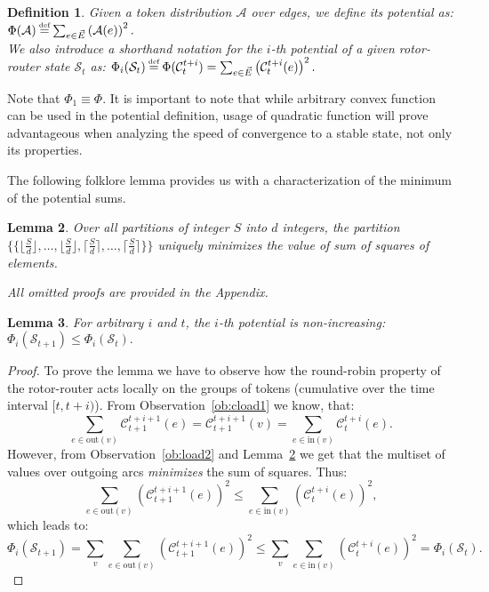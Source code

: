 \documentclass{article}[11pt,letter]
\newtheorem{definition}{Definition}[section]
\newtheorem{lemma}[definition]{Lemma}
\newcommand{\state}{\mathcal{S}}
\newcommand{\inedg}{\mathrm{in}}
\newcommand{\outedg}{\mathrm{out}}
\newcommand{\cload}{\mathcal{C}}
\newcommand{\mset}[1]{\{\!\{#1\}\!\}}
\newcommand\defeq{\stackrel{\mathclap{\normalfont{\mbox{\text{\tiny{def}}}}}}{=}}
\begin{document}
\begin{definition}
\label{def:pot}
Given a token distribution $\mathcal{A}$ over edges, we define its potential as:
$\Phi(\mathcal{A}) \defeq \sum_{e \in \vec{E}} \left(\mathcal{A}(e)\right)^2.$\\
We also introduce a shorthand notation for the $i$-th potential of a given rotor-router state $\state_t$ as:
$\Phi_i(\state_t) \defeq \Phi(\cload_t^{t+i}) = \sum_{e \in \vec{E}} \left(\cload_{t}^{t+i}(e)\right)^2.$
\end{definition}
Note that $\Phi_1 \equiv \Phi$. It is important to note that while arbitrary convex function can be used in the potential definition, usage of quadratic function will prove advantageous when analyzing the speed of convergence to a stable state, not only its properties.


The following folklore lemma provides us with a characterization of the minimum of the potential sums.
\begin{lemma}
\label{lem:sum_of_sq}
Over all partitions of integer $S$ into $d$ integers, the partition $\mset{\lfloor\frac{S}{d}\rfloor,\ldots,\lfloor\frac{S}{d}\rfloor,\allowbreak\lceil\frac{S}{d}\rceil,\ldots,\lceil\frac{S}{d}\rceil}$ uniquely minimizes the value of sum of squares of elements.
\end{lemma}
\emph{All omitted proofs are provided in the Appendix.}

\begin{lemma}
\label{lem:pot_drop}
For arbitrary $i$ and $t$, the $i$-th potential is non-increasing:
$\Phi_{i}(\state_{t+1}) \le \Phi_{i}(\state_{t}).$
\end{lemma}

\begin{proof}
To prove the lemma we have to observe how the round-robin property of the rotor-router acts locally on the groups of tokens (cumulative over the time interval $[t,t+i)$).
From Observation~\ref{ob:cload1} we know, that:
$$\sum_{e \in \outedg(v)} \cload_{t+1}^{t+i+1}(e) = \cload_{t+1}^{t+i+1}(v) = \sum_{e \in \inedg(v)} \cload_{t}^{t+i}(e).$$
However, from Observation~\ref{ob:load2} and Lemma~\ref{lem:sum_of_sq} we get that the multiset of values over outgoing arcs \emph{minimizes} the sum of squares.
Thus:
$$\sum_{e \in \outedg(v)} (\cload_{t+1}^{t+i+1}(e))^2 \le \sum_{e \in \inedg(v)} (\cload_{t}^{t+i}(e))^2,$$
which leads to:
$$\Phi_{i}(\state_{t+1}) = \sum_v \sum_{e \in \outedg(v)} (\cload_{t+1}^{t+i+1}(e))^2 \le \sum_v \sum_{e \in \inedg(v)} (\cload_{t}^{t+i}(e))^2 = \Phi_{i}(\state_{t}).$$

\end{proof}
\end{document}
